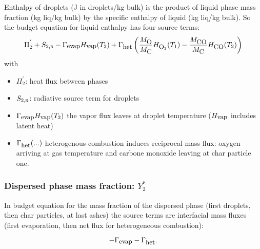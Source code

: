 Enthalpy of droplets (J in droplets/kg bulk) is the product of liquid phase mass
fraction (kg liq/kg bulk) by the specific enthalpy of liquid (kg liq/kg
bulk). So the budget equation for liquid enthalpy has four source terms:
\begin{equation}
     \Pi_{2}^{'}+S_{2,\mbox{\scriptsize\textsc{r}}}-\Gamma_{\mbox{\small evap}}H_{\mbox{\small vap}}(T_{2})
                        +\Gamma_{\mbox{\small het}}\left( \dfrac{M_{\mbox{\small O}}}{M_{\mbox{\small C}}}H_{\mbox{\small O}_{2}}(T_{1})
                                      -\dfrac{M_{\mbox{\small CO}   }}{M_{\mbox{\small C}}}H_{\mbox{\small CO}   }(T_{2})\right)
\end{equation}
with
\begin{itemize}
\item $\Pi_{2}^{'}$: heat flux between phases
\item $S_{2,\mbox{\scriptsize\textsc{r}}}$: radiative source term for droplets
\item $\Gamma_{\mbox{\small evap}}H_{\mbox{\small vap}}(T_{2})$ the vapor flux leaves at droplet temperature ($H_{\mbox{\small vap}}$ includes latent heat)
\item $\Gamma_{\mbox{\small het}}(...)$ heterogenous combustion induces reciprocal mass flux: oxygen arriving at gas temperature and carbone monoxide leaving
at char particle one.
\end{itemize}

\subsubsection{Dispersed phase mass fraction: $Y_{2}^{*}$}

In budget equation for the mass fraction of the dispersed phase (first droplets,
then char particles, at last ashes) the source terms are interfacial mass fluxes
(first evaporation, then net flux for heterogeneous combustion):

\begin{equation}
     -\Gamma_{\mbox{\small evap}}-\Gamma_{\mbox{\small het}} .
\end{equation}

\newpage

